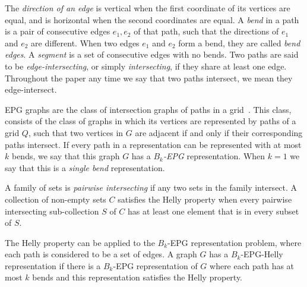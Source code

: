 \documentclass[runningheads]{llncs}
\begin{document}
 
 
 
 
The \emph{direction of an edge} is vertical when the first coordinate of its vertices  are equal, and is horizontal when the second coordinates are equal. A \emph {bend} in a path is a pair of consecutive edges $ e_1, e_2 $ of that path, such that the directions of $ e_1$ and $ e_2$ are different. When two edges $ e_1$ and $e_2 $ form a bend, they are called \emph { bend edges}. A \emph {segment} is a set of consecutive edges with no bends. %
 Two paths are said to be \emph{edge-intersecting}, or  simply  \emph{intersecting}, if they share at least one edge. %
 Throughout the paper any time we say that two paths intersect, we mean they edge-intersect.  %

EPG graphs are the class of intersection graphs of paths in a grid~\cite{golumbic2009}. This class,  consists of the class of graphs in which its vertices are represented by paths of a grid $ Q $, such that two vertices in $ G $ are adjacent if and only if their corresponding paths intersect. If every path in a representation can be represented with at most $ k $ bends, we say that this graph $ G $ has a \emph{ $ B_k$-EPG} representation.%
When $ k = 1 $ we say that this is a \emph{single bend} representation.


A family of sets is \emph{pairwise intersecting} if any two sets in the family intersect. A collection of non-empty sets $C$ satisfies the Helly property when every pairwise intersecting sub-collection $S$ of $ C $ has at least one element that is in every subset of $S$.

The Helly property can be applied to the $ B_k $-EPG representation problem, where each path is considered to be a set of edges. A graph $ G $ has a  $ B_k$-EPG-Helly representation if there is a $ B_k $-EPG representation of $G$ where each path has at most $ k $ bends and this representation satisfies the Helly property. %
% 
\end{document}
